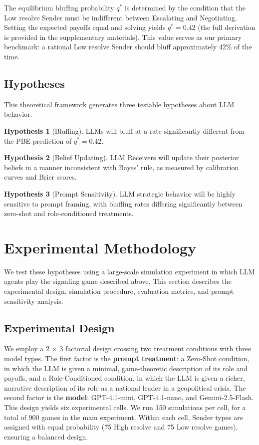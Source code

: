 \documentclass[12pt]{article}
\theoremstyle{plain}
\theoremstyle{definition}
\newtheorem{hypothesis}{Hypothesis}
\begin{document}
The equilibrium bluffing probability $q^*$ is determined by the condition that the Low resolve Sender must be indifferent between Escalating and Negotiating. Setting the expected payoffs equal and solving yields $q^* = 0.42$ (the full derivation is provided in the supplementary materials). This value serves as our primary benchmark: a rational Low resolve Sender should bluff approximately 42\% of the time.

\subsection{Hypotheses}

This theoretical framework generates three testable hypotheses about LLM behavior.

\begin{hypothesis}[Bluffing]
LLMs will bluff at a rate significantly different from the PBE prediction of $q^* = 0.42$.
\end{hypothesis}

\begin{hypothesis}[Belief Updating]
LLM Receivers will update their posterior beliefs in a manner inconsistent with Bayes' rule, as measured by calibration curves and Brier scores.
\end{hypothesis}

\begin{hypothesis}[Prompt Sensitivity]
LLM strategic behavior will be highly sensitive to prompt framing, with bluffing rates differing significantly between zero-shot and role-conditioned treatments.
\end{hypothesis}

\section{Experimental Methodology}

We test these hypotheses using a large-scale simulation experiment in which LLM agents play the signaling game described above. This section describes the experimental design, simulation procedure, evaluation metrics, and prompt sensitivity analysis.

\subsection{Experimental Design}

We employ a 2 $\times$ 3 factorial design crossing two treatment conditions with three model types. The first factor is the \textbf{prompt treatment}: a Zero-Shot condition, in which the LLM is given a minimal, game-theoretic description of its role and payoffs, and a Role-Conditioned condition, in which the LLM is given a richer, narrative description of its role as a national leader in a geopolitical crisis. The second factor is the \textbf{model}: GPT-4.1-mini, GPT-4.1-nano, and Gemini-2.5-Flash. This design yields six experimental cells. We run 150 simulations per cell, for a total of 900 games in the main experiment. Within each cell, Sender types are assigned with equal probability (75 High resolve and 75 Low resolve games), ensuring a balanced design.
\end{document}
